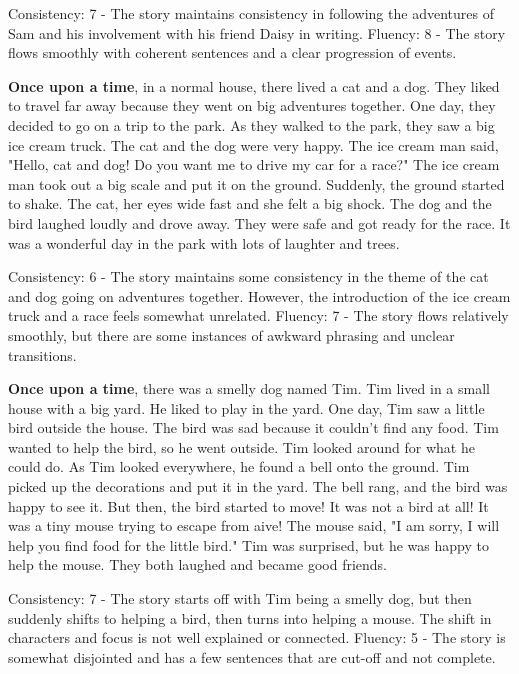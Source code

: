 \documentclass{article}
\begin{document}
Consistency: 7 - The story maintains consistency in following the adventures of Sam and his involvement with his friend Daisy in writing.
Fluency: 8 - The story flows smoothly with coherent sentences and a clear progression of events.

\textbf{Once upon a time}, in a normal house, there lived a cat and a dog. They liked to travel far away because they went on big adventures together. One day, they decided to go on a trip to the park. As they walked to the park, they saw a big ice cream truck. The cat and the dog were very happy. The ice cream man said, "Hello, cat and dog! Do you want me to drive my car for a race?" The ice cream man took out a big scale and put it on the ground. Suddenly, the ground started to shake. The cat, her eyes wide fast and she felt a big shock. The dog and the bird laughed loudly and drove away. They were safe and got ready for the race. It was a wonderful day in the park with lots of laughter and trees.

Consistency: 6 - The story maintains some consistency in the theme of the cat and dog going on adventures together. However, the introduction of the ice cream truck and a race feels somewhat unrelated.
Fluency: 7 - The story flows relatively smoothly, but there are some instances of awkward phrasing and unclear transitions.

\textbf{Once upon a time}, there was a smelly dog named Tim. Tim lived in a small house with a big yard. He liked to play in the yard. One day, Tim saw a little bird outside the house. The bird was sad because it couldn't find any food. Tim wanted to help the bird, so he went outside. Tim looked around for what he could do. As Tim looked everywhere, he found a bell onto the ground. Tim picked up the decorations and put it in the yard. The bell rang, and the bird was happy to see it. But then, the bird started to move! It was not a bird at all! It was a tiny mouse trying to escape from aive! The mouse said, "I am sorry, I will help you find food for the little bird." Tim was surprised, but he was happy to help the mouse. They both laughed and became good friends.

Consistency: 7 - The story starts off with Tim being a smelly dog, but then suddenly shifts to helping a bird, then turns into helping a mouse. The shift in characters and focus is not well explained or connected.
Fluency: 5 - The story is somewhat disjointed and has a few sentences that are cut-off and not complete.
\end{document}

